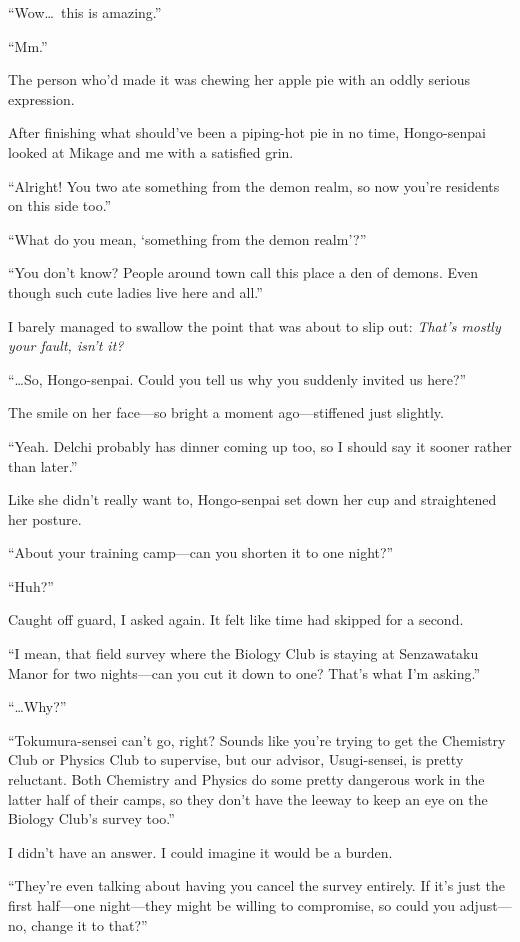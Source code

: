 \documentclass[
    a4paper,
    12pt,
    twoside,
    openany,
    UTF8,
    fontset=windows
]{ctexbook}
\begin{document}
``Wow\dots\ this is amazing.''

``Mm.''

The person who'd made it was chewing her apple pie with an oddly serious expression.

After finishing what should've been a piping-hot pie in no time, Hongo-senpai looked at Mikage and me with a satisfied grin.

``Alright! You two ate something from the demon realm, so now you're residents on this side too.''

``What do you mean, `something from the demon realm'?''

``You don't know? People around town call this place a den of demons. Even though such cute ladies live here and all.''

I barely managed to swallow the point that was about to slip out: \textit{That's mostly your fault, isn't it?}

``\dots So, Hongo-senpai. Could you tell us why you suddenly invited us here?''

The smile on her face---so bright a moment ago---stiffened just slightly.

``Yeah. Delchi probably has dinner coming up too, so I should say it sooner rather than later.''

Like she didn't really want to, Hongo-senpai set down her cup and straightened her posture.

``About your training camp---can you shorten it to one night?''

``Huh?''

Caught off guard, I asked again. It felt like time had skipped for a second.

``I mean, that field survey where the Biology Club is staying at Senzawataku Manor for two nights---can you cut it down to one? That's what I'm asking.''

``\dots Why?''

``Tokumura-sensei can't go, right? Sounds like you're trying to get the Chemistry Club or Physics Club to supervise, but our advisor, Usugi-sensei, is pretty reluctant. Both Chemistry and Physics do some pretty dangerous work in the latter half of their camps, so they don't have the leeway to keep an eye on the Biology Club's survey too.''

I didn't have an answer. I could imagine it would be a burden.

``They're even talking about having you cancel the survey entirely. If it's just the first half---one night---they might be willing to compromise, so could you adjust---no, change it to that?''
\end{document}
